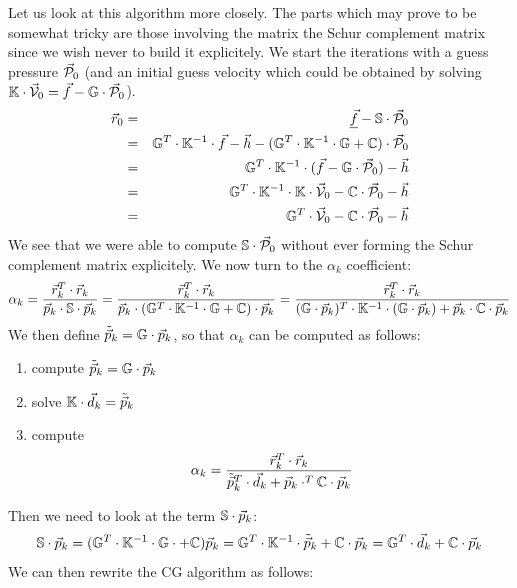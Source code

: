 Let us look at this algorithm more closely. The parts which may prove to be somewhat tricky 
are those involving the matrix the Schur complement matrix since we wish never to build 
it explicitely. We start the iterations with a guess pressure $\vec{\cal P}_0$ (and an initial guess velocity 
which could be obtained by 
solving ${\mathbb{K}}\cdot \vec{\cal V}_0 =\vec{f}- {\mathbb{G}}\cdot \vec{\cal P}_0$).
\begin{eqnarray}
\vec{r}_0 
&=& \underline{\vec{f}}-{\mathbb{S}} \cdot \vec{\cal P}_0 \\
&=& {\mathbb{G}}^T\cdot {\mathbb{K}}^{-1}\cdot \vec{f} - \vec{h} - ({\mathbb{G}}^T\cdot {\mathbb{K}}^{-1}\cdot {\mathbb{G}} + {\mathbb{C}})\cdot \vec{\cal P}_0 \\ 
&=& {\mathbb{G}}^T\cdot {\mathbb{K}}^{-1}\cdot (\vec{f} - {\mathbb{G}}\cdot \vec{\cal P}_0) - \vec{h} \\
&=& {\mathbb{G}}^T\cdot {\mathbb{K}}^{-1}\cdot {\mathbb{K}}\cdot \vec{\cal V}_0 -{\mathbb{C}} \cdot \vec{\cal P}_0 - \vec{h} \\ 
&=& {\mathbb{G}}^T\cdot \vec{\cal V}_0  -{\mathbb{C}} \cdot \vec{\cal P}_0   - \vec{h} 
\end{eqnarray}
We see that we were able to compute ${\mathbb{S}} \cdot \vec{\cal P}_0$ without ever forming the 
Schur complement matrix explicitely. We now turn to the $\alpha_k$ coefficient:
\[
\alpha_k 
= \frac{\vec{r}_k^T\cdot \vec{r}_k }{\vec{p}_k \cdot {\mathbb{S}}\cdot  \vec{p}_k } 
= \frac{\vec{r}_k^T \cdot \vec{r}_k }{\vec{p}_k\cdot ({\mathbb{G}}^T \cdot {\mathbb{K}}^{-1} \cdot {\mathbb{G}} +{\mathbb{C}} )\cdot \vec{p}_k } 
= \frac{\vec{r}_k^T \cdot \vec{r}_k }{({\mathbb{G}}\cdot \vec{p}_k)^T \cdot  {\mathbb{K}}^{-1} \cdot ({\mathbb{G}} \cdot \vec{p}_k) + \vec{p}_k\cdot {\mathbb{C}}\cdot \vec{p}_k } 
\]
We then define $\tilde{\vec{p}}_k = {\mathbb{G}} \cdot \vec{p}_k$, so that $\alpha_k$ can be computed as follows:
\begin{enumerate}
\item compute $\tilde{\vec{p}}_k = {\mathbb{G}} \cdot  \vec{p}_k$
\item solve ${\mathbb{K}}\cdot  \vec{d}_k = \tilde{\vec{p}}_k$
\item compute 
\[
\alpha_k=\frac{\vec{r}_k^T \cdot \vec{r}_k}{\tilde{\vec{p}}_k^T \cdot \vec{d}_k 
+ \vec{p}_k\cdot^T {\mathbb{C}}\cdot \vec{p}_k }
\]
\end{enumerate}
Then we need to look at the term ${\mathbb{S}}\cdot \vec{p}_k$:
\[
{\mathbb{S}}\cdot \vec{p}_k = ({\mathbb{G}}^T\cdot {\mathbb{K}}^{-1}\cdot {\mathbb{G}}\cdot +{\mathbb{C}} )\vec{p}_k 
= {\mathbb{G}}^T\cdot {\mathbb{K}}^{-1}\cdot \tilde{\vec{p}}_k  + {\mathbb{C}}\cdot \vec{p}_k= {\mathbb{G}}^T\cdot  \vec{d}_k + {\mathbb{C}} \cdot \vec{p}_k
\]
We can then rewrite the CG algorithm as follows: 
